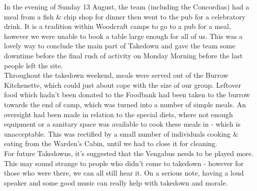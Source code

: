 In the evening of Sunday 13 August, the team (including the Concordias) had a meal from a fish \& chip shop for dinner then went to the pub for a celebratory drink. It is a tradition within Woodcraft camps to go to a pub for a meal, however we were unable to book a table large enough for all of us. This was a lovely way to conclude the main part of Takedown and gave the team some downtime before the final rush of activity on Monday Morning before the last people left the site. \\

Throughout the takedown weekend, meals were served out of the Burrow Kitchenette, which could just about cope with the size of our group. Leftover food which hadn't been donated to the Foodbank had been taken to the burrow towards the end of camp, which was turned into a number of simple meals. An oversight had been made in relation to the special diets, where not enough equipment or a sanitary space was available to cook these meals in - which is unacceptable. This was rectified by a small number of individuals cooking \& eating from the Warden's Cabin, until we had to close it for cleaning.\\

For future Takedowns, it's suggested that the Vengabus needs to be played more. This may sound strange to people who didn't come to takedown - however for those who were there, we can all still hear it. On a serious note, having a loud speaker and some good music can really help with takedown and morale. 

